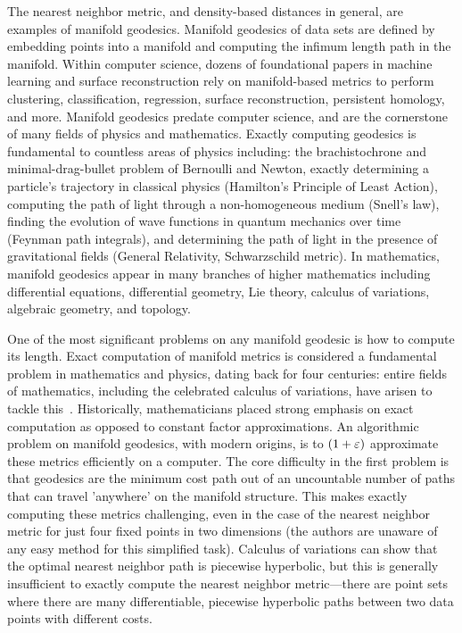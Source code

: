 The nearest neighbor metric, and density-based distances in general, are examples of manifold geodesics.
Manifold geodesics of data sets are defined by embedding points into a manifold and computing the infimum length path in the manifold.
Within computer science, dozens of foundational papers in machine learning and surface reconstruction rely on manifold-based metrics to perform clustering, classification, regression, surface reconstruction, persistent homology, and more.
Manifold geodesics predate computer science, and are the cornerstone of many fields of physics and mathematics.
Exactly computing geodesics is fundamental to countless areas of physics including: the brachistochrone and minimal-drag-bullet problem of Bernoulli and Newton, exactly determining a particle's trajectory in classical physics (Hamilton's Principle of Least Action), computing the path of light through a non-homogeneous medium (Snell's law), finding the evolution of wave functions in quantum mechanics over time (Feynman path integrals), and determining the path of light in the presence of gravitational fields (General Relativity, Schwarzschild metric).
In mathematics, manifold geodesics appear in many branches of higher mathematics including differential equations, differential geometry, Lie theory, calculus of variations, algebraic geometry, and topology.

One of the most significant problems on any manifold geodesic is how to compute its length.
Exact computation of manifold metrics is considered a fundamental problem in mathematics and physics, dating back for four centuries: entire fields of mathematics, including the celebrated calculus of variations, have arisen to tackle this~\cite{}. Historically, mathematicians placed strong emphasis on exact computation as opposed to constant factor approximations. An algorithmic problem on manifold geodesics, with modern origins, is to $(1+\varepsilon)$ approximate these metrics efficiently on a computer.
The core difficulty in the first problem is that geodesics are the minimum cost path out of an uncountable number of paths that can travel 'anywhere' on the manifold structure.
This makes exactly computing these metrics challenging, even in the case of the nearest neighbor metric for just four fixed points in two dimensions (the authors
are unaware of any easy method for this simplified task).
Calculus of variations can show that the optimal nearest neighbor path is piecewise hyperbolic, but this is generally insufficient to exactly
compute the nearest neighbor metric---there are point sets where there are
many differentiable, piecewise hyperbolic paths between two data points with
different costs.


